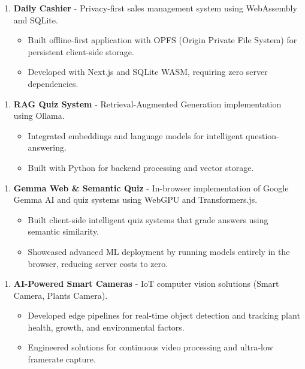 \documentclass{article}
\begin{document}
\begin{enumerate}
    \item \textbf{Daily Cashier} - Privacy-first sales management system using WebAssembly and SQLite.
   \begin{itemize}
    \item Built offline-first application with OPFS (Origin Private File System) for persistent client-side storage.
    \item Developed with Next.js and SQLite WASM, requiring zero server dependencies.
   \end{itemize}
\end{enumerate}

\begin{enumerate}
    \item \textbf{RAG Quiz System} - Retrieval-Augmented Generation implementation using Ollama.
   \begin{itemize}
    \item Integrated embeddings and language models for intelligent question-answering.
    \item Built with Python for backend processing and vector storage.
   \end{itemize}
\end{enumerate}

\begin{enumerate}
    \item \textbf{Gemma Web \& Semantic Quiz} - In-browser implementation of Google Gemma AI and quiz systems using WebGPU and Transformers.js.
   \begin{itemize}
    \item Built client-side intelligent quiz systems that grade answers using semantic similarity.
    \item Showcased advanced ML deployment by running models entirely in the browser, reducing server costs to zero.
   \end{itemize}
\end{enumerate}

\begin{enumerate}
    \item \textbf{AI-Powered Smart Cameras} - IoT computer vision solutions (Smart Camera, Plants Camera).
   \begin{itemize}
    \item Developed edge pipelines for real-time object detection and tracking plant health, growth, and environmental factors.
    \item Engineered solutions for continuous video processing and ultra-low framerate capture.
   \end{itemize}
\end{enumerate}
\end{document}

